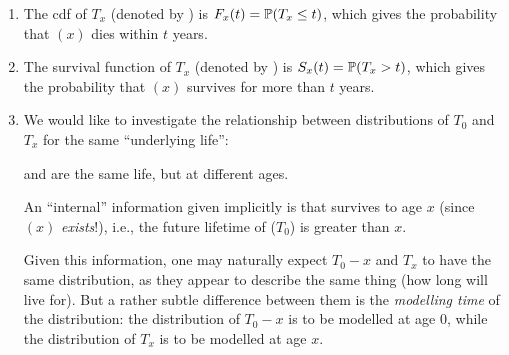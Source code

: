 \begin{enumerate}
\item The cdf of \(T_x\) (denoted by ) is
\(F_x(t)=\mathbb{P}\qty(T_x\le t)\), which gives the probability that \((x)\) dies
within \(t\) years.

\item The survival function of \(T_x\) (denoted by ) is
\(S_x(t)=\mathbb{P}\qty(T_x>t)\), which gives the probability that \((x)\) survives for
more than \(t\) years.

\item \label{it:key-assum} We would like to investigate the relationship between
distributions of \(T_0\) and \(T_x\) for the same ``underlying life'':



\begin{note}
 and  are the same life, but at different ages.
\end{note}

An ``internal'' information given implicitly is that 
survives to age \(x\) (since \((x)\) \emph{exists}!), i.e., the future lifetime
of  (\(T_0\)) is greater than \(x\).

Given this information, one may naturally expect \(T_0-x\) and \(T_x\) to have
the same distribution, as they appear to describe the same thing (how long
 will live for). But a rather subtle difference between them is
the \emph{modelling time} of the distribution: the distribution of \(T_0-x\) is
to be modelled at age 0, while the distribution of \(T_x\) is to be modelled at
age \(x\).


\end{enumerate}
